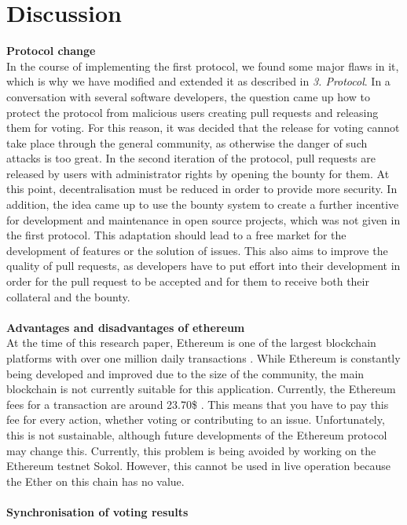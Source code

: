 \documentclass[sigconf]{acmart}
\begin{document}
\section{Discussion}
\textbf{Protocol change}\\
In the course of implementing the first protocol, we found some major flaws in it, which is why we have modified and extended it as 
described in \textit{3. Protocol}. In a conversation with several software developers, the question came up how to protect the protocol from 
malicious users creating pull requests and releasing them for voting.  For this reason, it was decided that the release for voting cannot take
 place through the general community, as otherwise the danger of such attacks is too great. In the second iteration of the protocol, pull 
requests are released by users with administrator rights by opening the bounty for them. At this point, decentralisation must be reduced 
in order to provide more security. In addition, the idea came up to use the bounty system to create a further incentive for development and maintenance in open source projects, which was not given in the first protocol. This adaptation should lead to a free market for the 
development of features or the solution of issues. This also aims to improve the quality of pull requests, as developers have to put effort 
into their development in order for the pull request to be accepted and for them to receive both their collateral and the bounty. \\ \\
\textbf{Advantages and disadvantages of ethereum}\\
At the time of this research paper, Ethereum is one of the largest blockchain platforms with over one million daily transactions \cite{eth2021scan}.
While Ethereum is constantly being developed and improved due to the size of the community, the main blockchain is not currently 
suitable for this application. Currently, the Ethereum fees for a transaction are around 23.70\$ \cite{eth2021fees}. This means that you have to pay this 
fee for every action, whether voting or contributing to an issue. Unfortunately, this is not sustainable, although future developments 
of the Ethereum protocol may change this. Currently, this problem is being avoided by working on the Ethereum testnet Sokol. 
However, this cannot be used in live operation because the Ether on this chain has no value. \\ \\
\textbf{Synchronisation of voting results}\\
\end{document}
